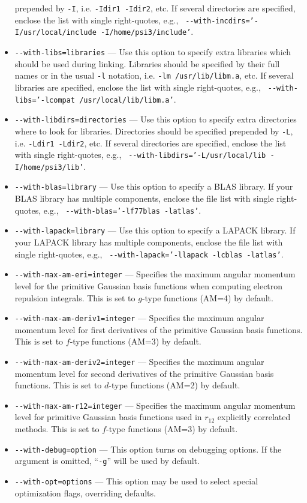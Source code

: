 \documentclass[12pt]{article}
\begin{document}
\begin{itemize}
  prepended by {\tt -I}, i.e. {\tt -Idir1 -Idir2}, etc. If several directories are specified,
  enclose the list with single right-quotes, e.g., {\tt
  -}{\tt -with-incdirs='-I/usr/local/include -I/home/psi3/include'}.
\item {\tt -}{\tt -with-libs=libraries} --- Use this option to specify extra
  libraries which should be used during linking. Libraries should be specified by
  their full names or in the usual {\tt -l} notation, i.e. {\tt -lm /usr/lib/libm.a}, etc.
  If several libraries are specified, enclose the list with single right-quotes, e.g., {\tt
  -}{\tt -with-libs='-lcompat /usr/local/lib/libm.a'}.
\item {\tt -}{\tt -with-libdirs=directories} --- Use this option to specify extra
  directories where to look for libraries. Directories should be specified
  prepended by {\tt -L}, i.e. {\tt -Ldir1 -Ldir2}, etc. If several directories are specified,
  enclose the list with single right-quotes, e.g., {\tt
  -}{\tt -with-libdirs='-L/usr/local/lib -I/home/psi3/lib'}.
\item {\tt -}{\tt -with-blas=library} --- Use this option to specify a BLAS
  library.  If your BLAS library has multiple components, enclose the
  file list with single right-quotes, e.g., {\tt
  -}{\tt -with-blas='-lf77blas -latlas'}.
\item {\tt -}{\tt -with-lapack=library} --- Use this option to specify a
  LAPACK library.  If your LAPACK library has multiple components,
  enclose the file list with single right-quotes, e.g., {\tt
  -}{\tt -with-lapack='-llapack -lcblas -latlas'}.
\item {\tt -}{\tt -with-max-am-eri=integer} --- Specifies the maximum
  angular momentum level for the primitive Gaussian basis functions
  when computing electron repulsion integrals.  This is set to
  $g$-type functions (AM=4) by default.
\item {\tt -}{\tt -with-max-am-deriv1=integer} --- Specifies the maximum
  angular momentum level for first derivatives of the primitive
  Gaussian basis functions.  This is set to $f$-type functions (AM=3)
  by default.
\item {\tt -}{\tt -with-max-am-deriv2=integer} --- Specifies the maximum
  angular momentum level for second derivatives of the primitive
  Gaussian basis functions.  This is set to $d$-type functions (AM=2)
  by default.
\item {\tt -}{\tt -with-max-am-r12=integer} --- Specifies the maximum
  angular momentum level for primitive Gaussian basis functions used
  in $r_{12}$ explicitly correlated methods.  This is set to $f$-type
  functions (AM=3) by default.
\item {\tt -}{\tt -with-debug=option} --- This option turns on debugging
  options.  If the argument is omitted, ``{\tt -g}'' will be used by default.
\item {\tt -}{\tt -with-opt=options} --- This option may be used to select
  special optimization flags, overriding defaults.
\end{itemize}
\end{document}
